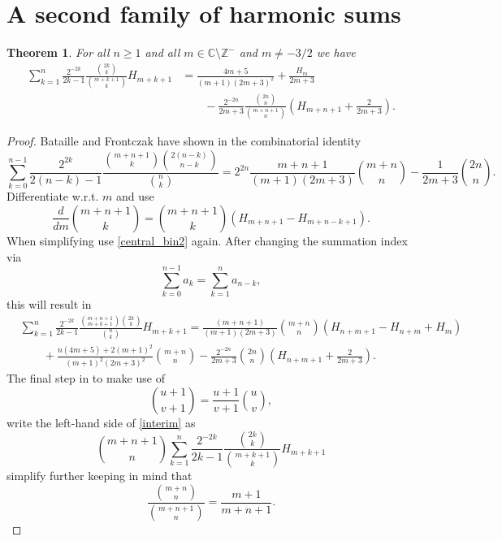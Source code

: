 \documentclass[11pt,reqno]{amsart}
\theoremstyle{plain}
\numberwithin{equation}{section}
\newtheorem{theorem}[thm]{Theorem}
\begin{document}
\section{A second family of harmonic sums}

\begin{theorem}\label{main_thm2}
For all $n\geq 1$ and all $m\in\mathbb C\setminus\mathbb Z^{-}$ and $m\neq -3/2$ we have
\begin{align}
\sum_{k=1}^n \frac{2^{-2k}}{2k-1} \frac{\binom{2k}{k}}{\binom{m+k+1}{k}} H_{m+k+1} &= \frac{4m+5}{(m+1)(2m+3)^2} + \frac{H_m}{2m+3} \nonumber \\
&\qquad - \frac{2^{-2n}}{2m+3} \frac{\binom{2n}{n}}{\binom{m+n+1}{n}}\left (H_{m+n+1} + \frac{2}{2m+3} \right ).
\end{align}
\end{theorem}
\begin{proof}
Bataille and Frontczak have shown in \cite[Theorem 4.2]{Bataille} the combinatorial identity
\begin{equation}\label{central_bin2}
\sum_{k=0}^{n-1} \frac{2^{2k}}{2(n-k)-1} \frac{\binom{m+n+1}{k} \binom{2(n-k)}{n-k}}{\binom{n}{k}} 
= 2^{2n} \frac{m+n+1}{(m+1)(2m+3)}\binom{m+n}{n} - \frac{1}{2m+3}\binom{2n}{n}.
\end{equation}
Differentiate w.r.t. $m$ and use
$$\frac{d}{dm} \binom{m+n+1}{k} = \binom{m+n+1}{k} (H_{m+n+1}-H_{m+n-k+1}).$$
When simplifying use \eqref{central_bin2} again. After changing the summation index via
$$\sum_{k=0}^{n-1} a_k = \sum_{k=1}^{n} a_{n-k},$$
this will result in
\begin{align}\label{interim}
&\sum_{k=1}^n \frac{2^{-2k}}{2k-1} \frac{\binom{m+n+1}{m+k+1} \binom{2k}{k}}{\binom{n}{k}} H_{m+k+1} = 
\frac{(m+n+1)}{(m+1)(2m+3)} \binom{m+n}{n} \left ( H_{n+m+1} - H_{n+m} + H_m \right ) \nonumber \\
&\qquad + \frac{n(4m+5)+2(m+1)^2}{(m+1)^2(2m+3)^2} \binom{m+n}{n} - \frac{2^{-2n}}{2m+3} \binom{2n}{n}\left (H_{n+m+1} + \frac{2}{2m+3} \right ).
\end{align}
The final step in to make use of
$$\binom{u+1}{v+1} = \frac{u+1}{v+1} \binom{u}{v},$$
write the left-hand side of \eqref{interim} as
$$\binom{m+n+1}{n} \sum_{k=1}^n \frac{2^{-2k}}{2k-1} \frac{\binom{2k}{k}}{\binom{m+k+1}{k}} H_{m+k+1}$$
simplify further keeping in mind that
$$\frac{\binom{m+n}{n}}{\binom{m+n+1}{n}} = \frac{m+1}{m+n+1}.$$
\end{proof}
\end{document}
